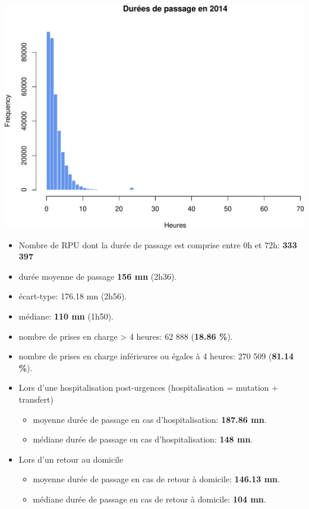\documentclass[]{article}
\begin{document}
\includegraphics{rapport2014_V4_files/figure-latex/passages-1.pdf}

\begin{itemize}
\item
  Nombre de RPU dont la durée de passage est comprise entre 0h et 72h:
  \textbf{333 397}
\item
  durée moyenne de passage \textbf{156 mn} (2h36).
\item
  écart-type: 176.18 mn (2h56).
\item
  médiane: \textbf{110 mn} (1h50).
\item
  nombre de prises en charge \textgreater{} 4 heures: 62 888
  (\textbf{18.86 \%}).
\item
  nombre de prises en charge inférieures ou égales à 4 heures: 270 509
  (\textbf{81.14 \%}).
\item
  Lors d'une hospitalisation post-urgences (hospitalisation = mutation +
  transfert)

  \begin{itemize}
  \itemsep1pt\parskip0pt
  \item
    moyenne durée de passage en cas d'hospitalisation: \textbf{187.86
    mn}.
  \item
    médiane durée de passage en cas d'hospitalisation: \textbf{148 mn}.
  \end{itemize}
\item
  Lors d'un retour au domicile

  \begin{itemize}
  \itemsep1pt\parskip0pt
  \item
    moyenne durée de passage en cas de retour à domicile: \textbf{146.13
    mn}.
  \item
    médiane durée de passage en cas de retour à domicile: \textbf{104
    mn}.
  \end{itemize}
\end{itemize}
\end{document}
